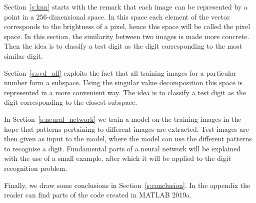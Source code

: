 Section~\ref{s:knn} starts with the remark that each image can be represented by a point in a 256-dimensional space.
In this space each element of the vector corresponds to the brightness of a pixel, hence this space will be called the pixel space.
In this section, the similarity between two images is made more concrete.
Then the idea is to classify a test digit as the digit corresponding to the most similar digit.

Section~\ref{s:svd_all} exploits the fact that all training images for a particular number form a subspace. Using the singular value decomposition this space is represented in a more convenient way.
The idea is to classify a test digit as the digit corresponding to the closest subspace.

In Section~\ref{s:neural_network} we train a model on the training images in the hope that patterns pertaining to different images are extracted.
Test images are then given as input to the model, where the model can use the different patterns to recognise a digit.
Fundamental parts of a neural network will be explained with the use of a small example, after which it will be applied to the digit recognition problem.

Finally, we draw some conclusions in Section~\ref{s:conclusion}.
In the appendix the reader can find parts of the code created in MATLAB 2019a.

